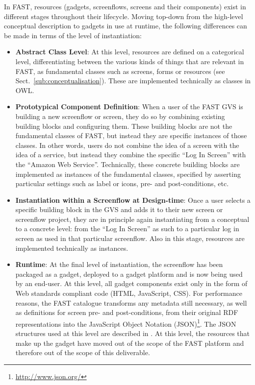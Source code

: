 \documentclass{article}
\begin{document}
In FAST, resources (gadgets, screenflows, screens and their components) exist in different stages throughout their lifecycle. Moving top-down from the high-level conceptual description to gadgets in use at runtime, the following differences can be made in terms of the level of instantiation:

\begin{itemize}
	\item \textbf{Abstract Class Level}: At this level, resources are defined on a categorical level, differentiating between the various kinds of things that are relevant in FAST, as fundamental classes such as screens, forms or resources (see Sect.~\ref{sub:conceptualisation}). These are implemented technically as classes in OWL.
	\item \textbf{Prototypical Component Definition}: When a user of the FAST GVS is building a new screenflow or screen, they do so by combining existing building blocks and configuring them. These building blocks are not the fundamental classes of FAST, but instead they are specific instances of those classes. In other words, users do not combine the idea of a screen with the idea of a service, but instead they combine the specific ``Log In Screen'' with the ``Amazon Web Service''. Technically, these concrete building blocks are implemented as instances of the fundamental classes, specified by asserting particular settings such as label or icons, pre- and post-conditions, etc.
	\item \textbf{Instantiation within a Screenflow at Design-time}: Once a user selects a specific building block in the GVS and adds it to their new screen or screenflow project, they are in principle again instantiating from a conceptual to a concrete level: from the ``Log In Screen'' as such to a particular log in screen as used in that particular screenflow. Also in this stage, resources are implemented technically as instances.
	\item \textbf{Runtime}: At the final level of instantiation, the screenflow has been packaged as a gadget, deployed to a gadget platform and is now being used by an end-user. At this level, all gadget components exist only in the form of Web standards compliant code (HTML, JavaScript, CSS). For performance reasons, the FAST catalogue transforms any metadata still necessary, as well as definitions for screen pre- and post-conditions, from their original RDF representations into the JavaScript Object Notation (JSON)\footnote{\url{http://www.json.org/}}. The JSON structures used at this level are described in \cite{palaghita2010catalogue_manual}. At this level, the resources that make up the gadget have moved out of the scope of the FAST platform and therefore out of the scope of this deliverable.
\end{itemize}
\end{document}
